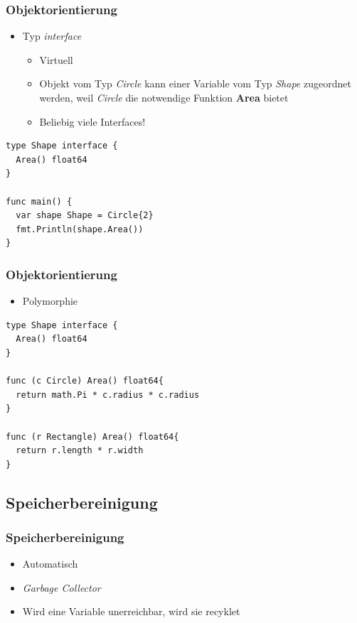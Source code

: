 \documentclass{beamer}
\begin{document}
\begin{frame}[fragile]
\frametitle{Objektorientierung}

\begin{itemize}
\item Typ \textit{interface}
\begin{itemize}
\setlength{\itemsep}{12pt}
\item Virtuell
\item Objekt vom Typ \textit{Circle} kann einer Variable vom Typ \textit{Shape} zugeordnet werden, weil \textit{Circle} die notwendige Funktion \textbf{Area} bietet
\item Beliebig viele Interfaces!
\end{itemize}
\end{itemize}

\begin{lstlisting}
type Shape interface {
  Area() float64
}

func main() {
  var shape Shape = Circle{2}
  fmt.Println(shape.Area())
}
\end{lstlisting}

\end{frame}

\begin{frame}[fragile]
\frametitle{Objektorientierung}

\begin{itemize}
\item Polymorphie
\end{itemize}

\begin{lstlisting}
type Shape interface {
  Area() float64
}

func (c Circle) Area() float64{
  return math.Pi * c.radius * c.radius
}

func (r Rectangle) Area() float64{
  return r.length * r.width
}
\end{lstlisting}

\end{frame}


\subsection{Speicherbereinigung}
\begin{frame}
\frametitle{Speicherbereinigung}

\begin{itemize}
\setlength{\itemsep}{30pt}
\item Automatisch
\item \textit{Garbage Collector}
\item Wird eine Variable unerreichbar, wird sie recyklet
\end{itemize}

\end{frame}
\end{document}
